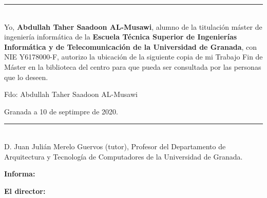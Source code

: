\thispagestyle{empty}


\noindent\rule[-1ex]{\textwidth}{2pt}\\[4.5ex]

Yo, \textbf{Abdullah Taher Saadoon AL-Musawi}, alumno de la titulación máster de ingeniería informática de la \textbf{Escuela Técnica Superior de Ingenierías Informática y de Telecomunicación de la Universidad de Granada}, con NIE Y6178000-F, autorizo la ubicación de la siguiente copia de mi Trabajo Fin de Máster en la biblioteca del centro para que pueda ser consultada por las personas que lo deseen.

\vspace{0.5cm}

\noindent Fdo: Abdullah Taher Saadoon AL-Musawi

\begin{figure}[h]
	\centering
	
\end{figure}

\begin{flushright}
Granada a 10 de septimpre de 2020.
\end{flushright}


\newpage

\thispagestyle{empty}

\noindent\rule[-1ex]{\textwidth}{2pt}\\[4.5ex]

D. Juan Julián Merelo Guervos (tutor), Profesor del Departamento de Arquitectura y Tecnología de Computadores de la Universidad de Granada.

\textbf{Informa:}




\textbf{El director:}

\begin{figure}[h]
	\centering
	
\end{figure}